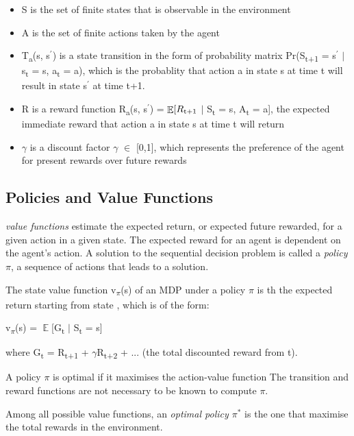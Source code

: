 \documentclass[12pt,twoside]{report}
\DeclareMathOperator{\E}{\mathbb{E}}
\begin{document}
\begin{itemize}
\item S is the set of finite states that is observable in the environment
\item A is the set of finite actions taken by the agent
\item T\textsubscript{a}(s, s$^\prime$) is a state transition in the form of probability matrix Pr(S\textsubscript{t+1} = s$^\prime$ $\vert$ s\textsubscript{t} = s, a\textsubscript{t} = a), which is the probablity that action a in state s at time t will result in state s$^\prime$ at time t+1.
\item R is a reward function R\textsubscript{a}(s, s$^\prime$) = $\displaystyle \E[R\textsubscript{t+1} $ $\vert$ S\textsubscript{t} = s, A\textsubscript{t} = a], the expected immediate reward that action a in state s at time t will return
\item $\gamma$ is a discount factor $\gamma$ $\in$ [0,1], which represents the preference of the agent for present rewards over future rewards
\end{itemize}

\subsection{Policies and Value Functions}
\textit{value functions} estimate the expected return, or expected future rewarded,  for a given action in a given state. The expected reward for an agent is dependent on the agent's action. A solution to the sequential decision problem is called a \textit{policy $\pi$}, a sequence of actions that leads to a solution.

The state value function v\textsubscript{$\pi$}(s) of an MDP under a policy $\pi$ is th the expected return starting from state , which is of the form: 

v\textsubscript{$\pi$}(s) = $\displaystyle \E$[G\textsubscript{t} $\vert$ S\textsubscript{t} = s]

where G\textsubscript{t} = R\textsubscript{t+1} + $\gamma$R\textsubscript{t+2} + ... (the total discounted reward from t). 

A policy $\pi$ is optimal if it maximises the action-value function
The transition and reward functions are not necessary to be known to compute $\pi$.

Among all possible value functions, an \textit{optimal policy $\pi^*$} is the one that maximise the total rewards in the environment.
\end{document}
